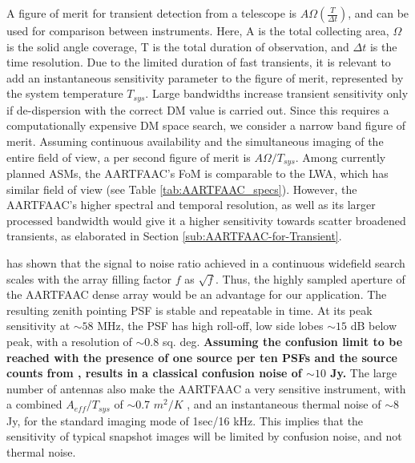 \documentclass{aa}
\begin{document}
A  figure of  merit  for transient  detection  \citep{cordes2004dynamic} from  a
telescope  is  $A\Omega\left(\frac{T}{\Delta t}\right)$,  and  can  be used  for
comparison between instruments.  Here, A  is the total collecting area, $\Omega$
is the solid angle coverage, T is the total duration of observation, and $\Delta
t$ is the time resolution. Due to the limited duration of fast transients, it is
relevant to add  an instantaneous sensitivity parameter to  the figure of merit,
represented  by the  system  temperature $T_{sys}$.   Large bandwidths  increase
transient sensitivity only if de-dispersion with the correct DM value is carried
out.  Since  this requires  a  computationally  expensive  DM space  search,  we
consider a narrow band figure of merit. Assuming continuous availability and the
simultaneous imaging of  the entire field of view, a per  second figure of merit
is  $A\Omega/T_{sys}$.  Among  currently  planned ASMs,  the  AARTFAAC's FoM  is
comparable  to   the  LWA,   which  has  similar   field  of  view   (see  Table
\ref{tab:AARTFAAC_specs}). However, the  AARTFAAC's higher spectral and temporal
resolution, as  well as its  larger processed bandwidth  would give it  a higher
sensitivity  towards  scatter broadened  transients,  as  elaborated in  Section
\ref{sub:AARTFAAC-for-Transient}.

\citet{backer1999pers} has  shown that the signal  to noise ratio  achieved in a
continuous  widefield  search  scales  with  the array  filling  factor  $f$  as
$\sqrt{f}$. Thus, the highly sampled  aperture of the AARTFAAC dense array would
be an advantage for our application. The resulting zenith pointing PSF is stable
and repeatable in  time. At its peak sensitivity at $\sim$$58$  MHz, the PSF has
high roll-off,  low side lobes  $\sim$$15$ dB below  peak, with a  resolution of
$\sim$$0.8$ sq.   deg.  \textbf{Assuming the  confusion  limit  to be  reached
  with  the presence of  one source  per ten  PSFs and  the source  counts from
  \citet{bregman2012system}, results in a classical confusion noise of $\sim$$10$
  Jy.}  The  large number of  antennas also make  the AARTFAAC a  very sensitive
instrument,   with   a  combined   $A_{eff}/T_{sys}$   of  $\sim$0.7   $m^{2}/K$
\citep{wijnholds2011situ}, and an instantaneous thermal noise of $\sim$8 Jy, for
the standard imaging mode of 1sec/16  kHz.  This implies that the sensitivity of
typical  snapshot images will  be limited  by confusion  noise, and  not thermal
noise.
\end{document}
